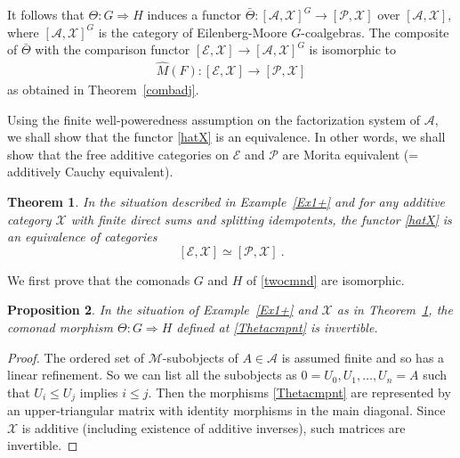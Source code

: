 \documentclass[a4paper,12pt,reqno]{amsart}
\newtheorem{theorem}{Theorem}[section] %
\newtheorem{proposition}[theorem]{Proposition}
\theoremstyle{definition}
\theoremstyle{fact}
\theoremstyle{genquest}
\theoremstyle{step}
\newcommand{\dd}{\colon}
\newcommand{\lra}{\longrightarrow}
\newcommand{\ra}{\rightarrow}
\def\CA{{\mathscr A}}
\def\CE{{\mathscr E}}
\def\CM{{\mathscr M}}
\def\CP{{\mathscr P}}
\def\CX{{\mathscr X}}
\begin{document}
It follows that $\Theta \dd G\Rightarrow H$
induces a functor $\bar{\Theta} \dd [\CA,\CX]^G \ra [\CP,\CX]$ over $[\CA,\CX]$, 
where $[\CA,\CX]^G$ is the category of Eilenberg-Moore $G$-coalgebras.  
The composite of $\bar{\Theta}$ with the comparison functor 
$[\CE,\CX] \lra [\CA,\CX]^G$ is isomorphic to  
\begin{eqnarray}\label{hatX}
\widehat{M}(F) \dd [\CE, \CX] \lra [\CP, \CX]
\end{eqnarray}
as obtained in Theorem~\ref{combadj}.

Using the finite well-poweredness assumption on the factorization system of $\CA$, 
we shall show that the functor \eqref{hatX} is an equivalence.
In other words, we shall show that the free additive categories on
$\CE$ and $\CP$ are Morita equivalent (= additively Cauchy equivalent).

\begin{theorem}\label{parmapthm}
In the situation described in Example~\ref{Ex1+} and for any additive category $\CX$
with finite direct sums and splitting idempotents, 
the functor \eqref{hatX} is an equivalence of categories
$$[\CE, \CX] \simeq [\CP, \CX] \ . $$
\end{theorem}

We first prove that the comonads $G$ and $H$ of \eqref{twocmnd} are isomorphic.

\begin{proposition}\label{invTheta}
In the situation of Example~\ref{Ex1+} and $\CX$ as in Theorem~\ref{parmapthm}, 
the comonad morphism
$\Theta \dd G\Rightarrow H$ defined at \eqref{Thetacmpnt} is invertible.
\end{proposition}
\begin{proof}
The ordered set of $\CM$-subobjects of $A \in \CA$ is assumed finite
and so has a linear refinement. 
So we can list all the subobjects as $0=U_0, U_1, \dots , U_n = A$ 
such that $U_i \le U_j$ implies $i \le j$.
Then the morphisms \eqref{Thetacmpnt} are represented by an
upper-triangular matrix with identity morphisms in the main diagonal.
Since $\CX$ is additive (including existence of additive inverses), such
matrices are invertible.
\end{proof}
\end{document}

